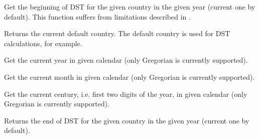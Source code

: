 \label{wxdatetimegetbegindst}


Get the beginning of DST for the given country in the given year (current one
by default). This function suffers from limitations described in
.




\label{wxdatetimegetcountry}


Returns the current default country. The default country is used for DST
calculations, for example.




\label{wxdatetimegetcurrentyear}


Get the current year in given calendar (only Gregorian is currently supported).


\label{wxdatetimegetcurrentmonth}


Get the current month in given calendar (only Gregorian is currently supported).


\label{wxdatetimegetcenturystatic}


Get the current century, i.e. first two digits of the year, in given calendar
(only Gregorian is currently supported).


\label{wxdatetimegetenddst}


Returns the end of DST for the given country in the given year (current one by
default).


